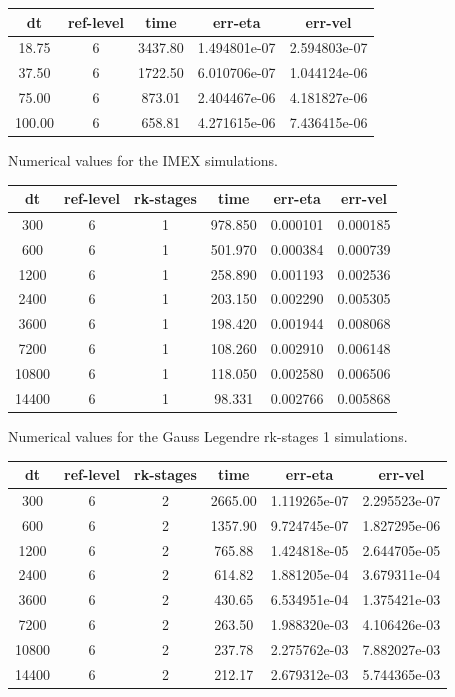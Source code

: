 \documentclass[a4paper, 12pt]{article}
\begin{document}
\begin{tabular}{c|c|c|c|c}
dt    & ref-level &  time    & err-eta      &    err-vel \\ \hline
18.75 & 6         &  3437.80 & 1.494801e-07 &  2.594803e-07 \\
37.50     &     6  &  1722.50 & 6.010706e-07  &1.044124e-06 \\
75.00   &       6  &   873.01 & 2.404467e-06 & 4.181827e-06 \\
100.00     &     6  &   658.81 & 4.271615e-06 & 7.436415e-06
\end{tabular}
Numerical values for the IMEX simulations.
\\
\begin{tabular}{c|c|c|c|c|c}
dt    & ref-level & rk-stages & time  &    err-eta      &    err-vel \\ \hline
300    &       6  &  1    &978.850  &  0.000101 &  0.000185 \\
600    &       6  & 1    &501.970  & 0.000384 &  0.000739\\
1200   &        6 &  1    &258.890 &  0.001193 &  0.002536\\
2400    &       6 &  1    &203.150 &  0.002290 &  0.005305\\
3600   &        6 &  1    &198.420 &  0.001944 &  0.008068\\
7200    &       6  & 1    &108.260 &  0.002910 &  0.006148\\
10800    &       6 & 1    & 118.050 &  0.002580 &  0.006506\\
14400    &       6  & 1    & 98.331 &  0.002766 &  0.005868\\
\end{tabular}
{Numerical values for the Gauss Legendre rk-stages 1 simulations.}
\\
\begin{tabular}{c|c|c|c|c|c}
dt    & ref-level &  rk-stages & time    & err-eta      &    err-vel \\ \hline
300    &      6    &      2 & 2665.00 & 1.119265e-07 & 2.295523e-07 \\
600    &      6   &       2 & 1357.90 & 9.724745e-07 & 1.827295e-06\\
1200   &       6   &       2  & 765.88 & 1.424818e-05 & 2.644705e-05\\
2400    &      6   &       2 &  614.82 & 1.881205e-04 & 3.679311e-04\\
3600    &      6   &       2 &  430.65 & 6.534951e-04 & 1.375421e-03\\
7200    &      6    &      2  & 263.50 & 1.988320e-03 & 4.106426e-03\\
10800    &      6   &       2 &  237.78 & 2.275762e-03 & 7.882027e-03\\
14400    &      6   &       2 &  212.17 & 2.679312e-03 & 5.744365e-03\\
\end{tabular}
\end{document}
